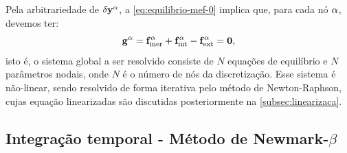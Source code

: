 \documentclass[Tese.tex]{subfiles}
\begin{document}
Pela arbitrariedade de $\delta\mathbf{y}^\alpha$, a \cref{eq:equilibrio-mef-0} implica que, para cada nó $\alpha$, devemos ter:
\begin{equation}\label{eq:equilibrio-mef}
\mathbf{g}^\alpha = \mathbf{f}_\text{iner}^\alpha + \mathbf{f}_\text{int}^\alpha - \mathbf{f}_\text{ext}^\alpha = \mathbf{0},
\end{equation}
isto é, o sistema global a ser resolvido consiste de $N$ equações de equilíbrio e $N$ parâmetros nodais, onde $N$ é o número de nós da discretização. Esse sistema é não-linear, sendo resolvido de forma iterativa pelo método de Newton-Raphson, cujas equação linearizadas são discutidas posteriormente na \autoref{subsec:linearizaca}.


\subsection{Integração temporal  - Método de Newmark-$\beta$}
\end{document}
